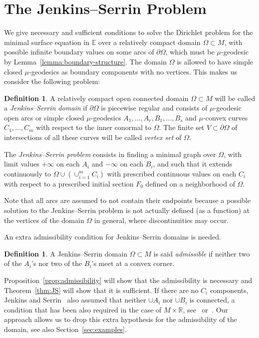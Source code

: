 \documentclass[a4paper,10pt,reqno]{amsart}
\newcommand{\R}{\mathbb{R}}
\newcommand{\E}{\mathbb{E}}
\theoremstyle{definition}
\newtheorem{definition}[theorem]{Definition}
\theoremstyle{remark}
\numberwithin{equation}{section}
\begin{document}
	
\section{The Jenkins--Serrin Problem}\label{sec:JS}
	
We give necessary and sufficient conditions to solve the Dirichlet problem for the minimal surface equation in $\E$ over a relatively compact domain $\Omega\subset M$, with possible infinite boundary values on some arcs of $\partial\Omega$, which must be $\mu$-geodesic by Lemma~\ref{lemma:boundary-structure}. The domain $\Omega$ is allowed to have simple closed $\mu$-geodesics as boundary components with no vertices. This makes us consider the following problem:

\begin{definition}\label{def:JS-problem}
A relatively compact open connected domain $\Omega\subset M$ will be called a \emph{Jenkins--Serrin domain} if $\partial\Omega$ is piecewise regular and consists of $\mu$-geodesic open arcs or simple closed $\mu$-geodesics $A_1,\ldots,A_r,B_1,\ldots,B_s$ and $\mu$-convex curves $C_1,\ldots,C_m$ with respect to the inner conormal to $\Omega$. The finite set $V\subset\partial\Omega$ of intersections of all these curves will be called \emph{vertex set} of $\Omega$. 

The \emph{Jenkins--Serrin problem} consists in finding a minimal graph over $\Omega$, with limit values $+\infty$ on each $A_i$ and $-\infty$ on each $B_i$, and such that it extends continuously to $\Omega\cup(\cup_{i=1}^mC_i)$ with prescribed continuous values on each $C_i$ with respect to a prescribed initial section $F_0$ defined on a neighborhood of $\Omega$.
\end{definition}

Note that all arcs are assumed to not contain their endpoints because a possible solution to the Jenkins--Serrin problem is not actually defined (as a function) at the vertices of the domain $\Omega$ in general, where discontinuities may occur. 

An extra admissibility condition for Jenkins--Serrin domains is needed.  

\begin{definition}
A Jenkins--Serrin domain $\Omega\subset M$ is said \emph{admissible} if neither two of the $A_i$'s nor two of the $B_i$'s meet at a convex corner.
\end{definition}

Proposition~\ref{prop:admissibility} will show that the admissibility is necessary and Theorem~\ref{thm:JS} will show that it is sufficient. If there are no $C_i$ components, Jenkins and Serrin~\cite{JS} also assumed that neither $\cup A_i$ nor $\cup B_i$ is connected, a condition that has been also required in the case of $M\times\R$, see~\cite{Pin} or~\cite{MRR}. Our approach allows us to drop this extra hypothesis for the admissibility of the domain, see also Section~\ref{sec:examples}.
\end{document}
